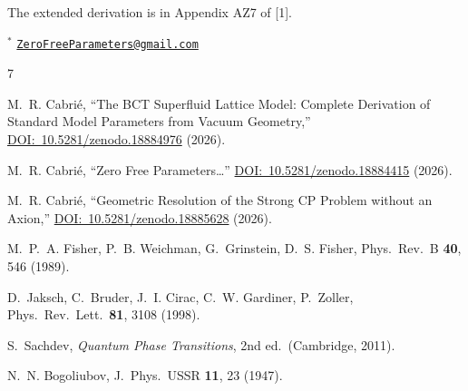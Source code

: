 \documentclass[10pt,twocolumn]{article}
\begin{document}
The extended derivation is in Appendix AZ7 of [1].

\bigskip
\noindent$^*$ \href{mailto:ZeroFreeParameters@gmail.com}{\texttt{ZeroFreeParameters@gmail.com}}

\begin{thebibliography}{7}

M.~R. Cabri\'{e}, ``The BCT Superfluid Lattice Model: Complete Derivation of Standard Model
Parameters from Vacuum Geometry,''
\href{https://doi.org/10.5281/zenodo.18884976}{DOI:~10.5281/zenodo.18884976} (2026).

M.~R. Cabri\'{e}, ``Zero Free Parameters\ldots''
\href{https://doi.org/10.5281/zenodo.18884415}{DOI:~10.5281/zenodo.18884415} (2026).

M.~R. Cabri\'{e}, ``Geometric Resolution of the Strong CP Problem without an Axion,''
\href{https://doi.org/10.5281/zenodo.18885628}{DOI:~10.5281/zenodo.18885628} (2026).

M.~P.~A. Fisher, P.~B. Weichman, G.~Grinstein, D.~S. Fisher,
Phys.\ Rev.\ B \textbf{40}, 546 (1989).

D.~Jaksch, C.~Bruder, J.~I. Cirac, C.~W. Gardiner, P.~Zoller,
Phys.\ Rev.\ Lett.\ \textbf{81}, 3108 (1998).

S.~Sachdev, \textit{Quantum Phase Transitions}, 2nd ed.\ (Cambridge, 2011).

N.~N. Bogoliubov, J.\ Phys.\ USSR \textbf{11}, 23 (1947).

\end{thebibliography}
\end{document}
